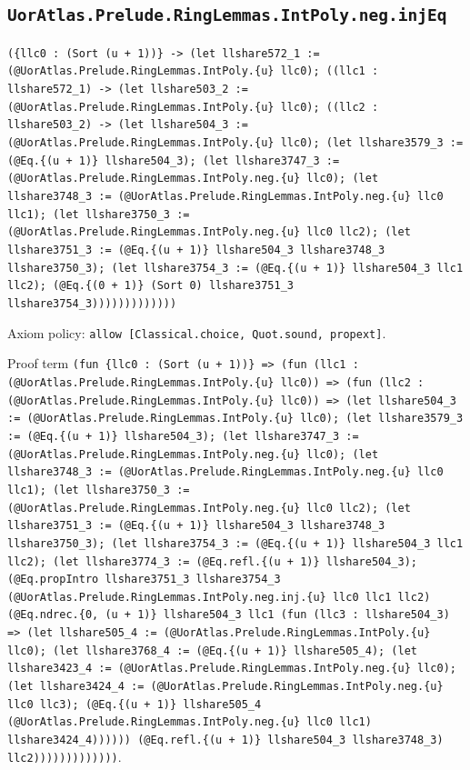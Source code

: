 \documentclass[11pt]{article}
\begin{document}
\subsection*{\texttt{UorAtlas.Prelude.RingLemmas.IntPoly.neg.injEq}}
\noindent\texttt{(\{llc0 : (Sort (u + 1))\} -> (let llshare572\_1 := (@UorAtlas.Prelude.RingLemmas.IntPoly.\{u\} llc0); ((llc1 : llshare572\_1) -> (let llshare503\_2 := (@UorAtlas.Prelude.RingLemmas.IntPoly.\{u\} llc0); ((llc2 : llshare503\_2) -> (let llshare504\_3 := (@UorAtlas.Prelude.RingLemmas.IntPoly.\{u\} llc0); (let llshare3579\_3 := (@Eq.\{(u + 1)\} llshare504\_3); (let llshare3747\_3 := (@UorAtlas.Prelude.RingLemmas.IntPoly.neg.\{u\} llc0); (let llshare3748\_3 := (@UorAtlas.Prelude.RingLemmas.IntPoly.neg.\{u\} llc0 llc1); (let llshare3750\_3 := (@UorAtlas.Prelude.RingLemmas.IntPoly.neg.\{u\} llc0 llc2); (let llshare3751\_3 := (@Eq.\{(u + 1)\} llshare504\_3 llshare3748\_3 llshare3750\_3); (let llshare3754\_3 := (@Eq.\{(u + 1)\} llshare504\_3 llc1 llc2); (@Eq.\{(0 + 1)\} (Sort 0) llshare3751\_3 llshare3754\_3)))))))))))))}\par
\noindent Axiom policy: \texttt{allow [Classical.choice, Quot.sound, propext]}.\par
\noindent Proof term \texttt{(fun \{llc0 : (Sort (u + 1))\} => (fun (llc1 : (@UorAtlas.Prelude.RingLemmas.IntPoly.\{u\} llc0)) => (fun (llc2 : (@UorAtlas.Prelude.RingLemmas.IntPoly.\{u\} llc0)) => (let llshare504\_3 := (@UorAtlas.Prelude.RingLemmas.IntPoly.\{u\} llc0); (let llshare3579\_3 := (@Eq.\{(u + 1)\} llshare504\_3); (let llshare3747\_3 := (@UorAtlas.Prelude.RingLemmas.IntPoly.neg.\{u\} llc0); (let llshare3748\_3 := (@UorAtlas.Prelude.RingLemmas.IntPoly.neg.\{u\} llc0 llc1); (let llshare3750\_3 := (@UorAtlas.Prelude.RingLemmas.IntPoly.neg.\{u\} llc0 llc2); (let llshare3751\_3 := (@Eq.\{(u + 1)\} llshare504\_3 llshare3748\_3 llshare3750\_3); (let llshare3754\_3 := (@Eq.\{(u + 1)\} llshare504\_3 llc1 llc2); (let llshare3774\_3 := (@Eq.refl.\{(u + 1)\} llshare504\_3); (@Eq.propIntro llshare3751\_3 llshare3754\_3 (@UorAtlas.Prelude.RingLemmas.IntPoly.neg.inj.\{u\} llc0 llc1 llc2) (@Eq.ndrec.\{0, (u + 1)\} llshare504\_3 llc1 (fun (llc3 : llshare504\_3) => (let llshare505\_4 := (@UorAtlas.Prelude.RingLemmas.IntPoly.\{u\} llc0); (let llshare3768\_4 := (@Eq.\{(u + 1)\} llshare505\_4); (let llshare3423\_4 := (@UorAtlas.Prelude.RingLemmas.IntPoly.neg.\{u\} llc0); (let llshare3424\_4 := (@UorAtlas.Prelude.RingLemmas.IntPoly.neg.\{u\} llc0 llc3); (@Eq.\{(u + 1)\} llshare505\_4 (@UorAtlas.Prelude.RingLemmas.IntPoly.neg.\{u\} llc0 llc1) llshare3424\_4)))))) (@Eq.refl.\{(u + 1)\} llshare504\_3 llshare3748\_3) llc2)))))))))))))}.\par
\end{document}
